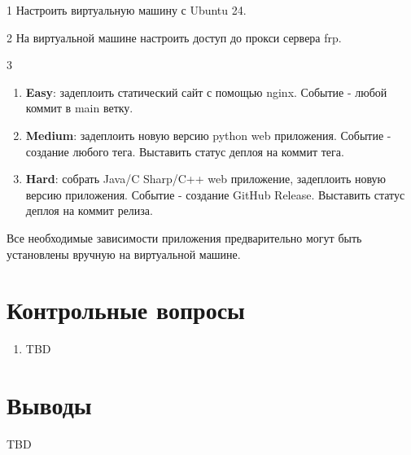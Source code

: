 \documentclass[12pt,a4paper]{article}
\begin{document}
\begin{task}{1}
    Настроить виртуальную машину с Ubuntu 24.
\end{task}

\begin{task}{2}
    На виртуальной машине настроить доступ до прокси сервера frp.
\end{task}

\begin{task}{3}
    \begin{enumerate}
        \item \textbf{Easy}: задеплоить статический сайт с помощью nginx. Событие - любой коммит в main ветку.
        \item \textbf{Medium}: задеплоить новую версию python web приложения. Событие - создание любого тега. Выставить статус деплоя на коммит тега.
        \item \textbf{Hard}: собрать Java/C Sharp/C++ web приложение, задеплоить новую версию приложения. Событие - создание GitHub Release. Выставить статус деплоя на коммит релиза.
    \end{enumerate}
    Все необходимые зависимости приложения предварительно могут быть установлены вручную на виртуальной машине.
\end{task}

\section{Контрольные вопросы}
\begin{enumerate}
    \item TBD
\end{enumerate}

\section{Выводы}
TBD
\end{document}
